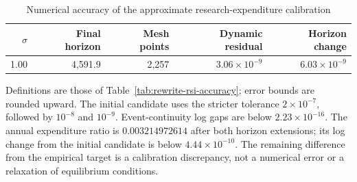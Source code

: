 \begin{table}[H]
 \centering
 \caption{Numerical accuracy of the approximate research-expenditure calibration}
 \label{tab:rewrite-research-share-accuracy}
 \small
 \begin{tabular}{rrrrr}
 \toprule
 $\sigma$ & Final horizon & Mesh points & Dynamic residual & Horizon change\\
 \midrule
 1.00 & 4,591.9 & 2,257 & $3.06\times10^{-9}$ & $6.03\times10^{-9}$\\
 \bottomrule
 \end{tabular}
 \par\smallskip
 \begin{minipage}{0.95\textwidth}\footnotesize
 Definitions are those of Table~\ref{tab:rewrite-rsi-accuracy}; error bounds
 are rounded upward. The initial candidate uses the stricter tolerance
 $2\times10^{-7}$, followed by $10^{-8}$ and $10^{-9}$. Event-continuity
 log gaps are below $2.23\times10^{-16}$. The annual expenditure ratio is
 $0.003214972614$ after both horizon extensions; its log change from the
 initial candidate is below $4.44\times10^{-10}$. The remaining difference
 from the empirical target is a calibration discrepancy, not a numerical
 error or a relaxation of equilibrium conditions.
 \end{minipage}
\end{table}
